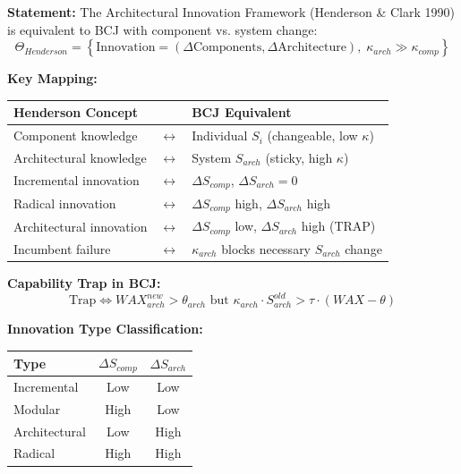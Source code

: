 \begin{tcolorbox}[colback=green!5!white, colframe=green!75!black,
    title=Theorem BCJ-T37: Henderson Innovation Architecture as Special Case]
\textbf{Statement:} The Architectural Innovation Framework (Henderson \& Clark 1990) is equivalent to BCJ with component vs. system change:
\begin{equation}
\Theta_{Henderson} = \left\{\text{Innovation} = (\Delta\text{Components}, \Delta\text{Architecture}), \; \kappa_{arch} \gg \kappa_{comp}\right\}
\end{equation}

\textbf{Key Mapping:}
\begin{center}
\begin{tabular}{lcl}
\toprule
\textbf{Henderson Concept} & & \textbf{BCJ Equivalent} \\
\midrule
Component knowledge & $\leftrightarrow$ & Individual $S_i$ (changeable, low $\kappa$) \\
Architectural knowledge & $\leftrightarrow$ & System $S_{arch}$ (sticky, high $\kappa$) \\
Incremental innovation & $\leftrightarrow$ & $\Delta S_{comp}$, $\Delta S_{arch} = 0$ \\
Radical innovation & $\leftrightarrow$ & $\Delta S_{comp}$ high, $\Delta S_{arch}$ high \\
Architectural innovation & $\leftrightarrow$ & $\Delta S_{comp}$ low, $\Delta S_{arch}$ high (TRAP) \\
Incumbent failure & $\leftrightarrow$ & $\kappa_{arch}$ blocks necessary $S_{arch}$ change \\
\bottomrule
\end{tabular}
\end{center}

\textbf{Capability Trap in BCJ:}
\begin{equation}
\text{Trap} \Leftrightarrow WAX_{arch}^{new} > \theta_{arch} \text{ but } \kappa_{arch} \cdot S_{arch}^{old} > \tau \cdot (WAX - \theta)
\end{equation}

\textbf{Innovation Type Classification:}
\begin{center}
\begin{tabular}{lcc}
\toprule
\textbf{Type} & \textbf{$\Delta S_{comp}$} & \textbf{$\Delta S_{arch}$} \\
\midrule
Incremental & Low & Low \\
Modular & High & Low \\
Architectural & Low & High \\
Radical & High & High \\
\bottomrule
\end{tabular}
\end{center}


\end{tcolorbox}
